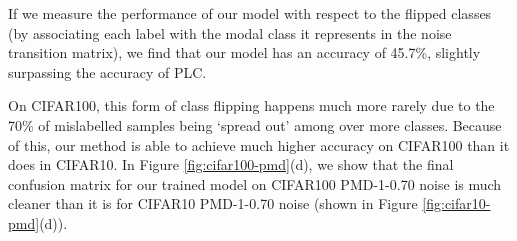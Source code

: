\documentclass[10pt,twocolumn,letterpaper]{article}
\begin{document}
If we measure the performance of our model with respect to the flipped classes (by associating each label with the modal class it represents in the noise transition matrix), we find that our model has an accuracy of 45.7\%, slightly surpassing the accuracy of PLC.

On CIFAR100, this form of class flipping happens much more rarely due to the 70\% of mislabelled samples being `spread out' among over more classes. Because of this, our method is able to achieve much higher accuracy on CIFAR100 than it does in CIFAR10. In Figure \ref{fig:cifar100-pmd}(d), we show that the final confusion matrix for our trained model on CIFAR100 PMD-1-0.70 noise is much cleaner than it is for CIFAR10 PMD-1-0.70 noise (shown in Figure \ref{fig:cifar10-pmd}(d)).

\begin{table*}[ht!]
    \begin{center}
    \end{center}
    \caption{Test accuracy (\%) for Polynomial Margin Diminishing Noise \cite{zhang2020learning}. Top methods are in \textbf{bold}.} 
    \label{tab:results_pmd_3}
\end{table*}
\end{document}
